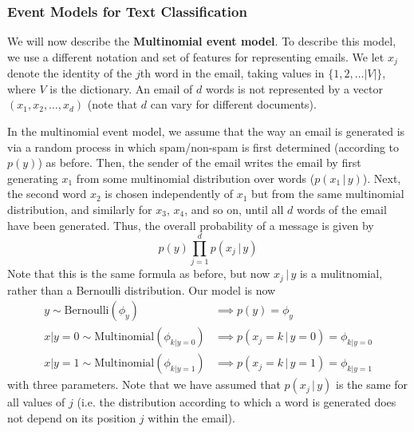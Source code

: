 \documentclass[a4paper, 12pt]{report}
\theoremstyle{remark}
\theoremstyle{definition}
\begin{document}
\subsubsection{Event Models for Text Classification}
We will now describe the \textbf{Multinomial event model}. To describe this model, we use a different notation and set of features for representing emails. We let $x_j$ denote the identity of the $j$th word in the email, taking values in $\{1, 2, \ldots |V|\}$, where $V$ is the dictionary. An email of $d$ words is not represented by a vector $(x_1, x_2, \ldots, x_d)$ (note that $d$ can vary for different documents). 

In the multinomial event model, we assume that the way an email is generated is via a random process in which spam/non-spam is first determined (according to $p(y)$) as before. Then, the sender of the email writes the email by first generating $x_1$ from some multinomial distribution over words ($p(x_1\,|\,y)$). Next, the second word $x_2$ is chosen independently of $x_1$ but from the same multinomial distribution, and similarly for $x_3$, $x_4$, and so on, until all $d$ words of the email have been generated. Thus, the overall probability of a message is given by
\[p(y) \prod_{j=1}^d p(x_j\,|\,y)\]
Note that this is the same formula as before, but now $x_j\,|\,y$ is a mulitnomial, rather than a Bernoulli distribution. Our model is now
\begin{align*}
    y \sim \text{Bernoulli}(\phi_y) & \implies p(y) = \phi_y \\
    x|y=0 \sim \text{Multinomial}(\phi_{k|y=0}) & \implies p(x_j = k\,|\, y = 0) = \phi_{k|y=0} \\
    x|y=1 \sim \text{Multinomial}(\phi_{k|y=1}) & \implies p(x_j = k\,|\, y = 1) = \phi_{k|y=1}
\end{align*}
with three parameters. Note that we have assumed that $p(x_j\,|\,y)$ is the same for all values of $j$ (i.e. the distribution according to which a word is generated does not depend on its position $j$ within the email). 
\end{document}
